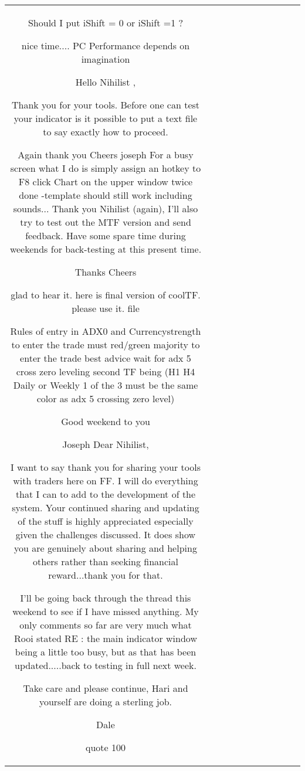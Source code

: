 \begin{table}[h!]
\begin{tabular}{|c|c|c|c|c|c|c|c|c|c|c|}
Should I put iShift = 0 or iShift =1 ?

nice time....
PC
Performance depends on imagination

Hello Nihilist ,

Thank you for your tools. Before one can test your indicator is it possible to put a text file to say exactly how to proceed.

Again thank you Cheers joseph
For a busy screen what I do is simply assign an hotkey to F8 click Chart on the upper window twice done -template should still work including sounds...
Thank you Nihilist (again), I'll also try to test out the MTF version and send feedback. Have some spare time during weekends for back-testing at this present time.

Thanks
Cheers

glad to hear it. here is final version of coolTF. please use it. {file}

Rules of entry in ADX0 and Currencystrength to enter the trade must red/green majority to enter the trade best advice wait
for adx 5 cross zero leveling second TF being (H1 H4 Daily or Weekly 1 of the 3 must be the same color as adx 5 crossing zero level)

Good weekend to you

Joseph
Dear Nihilist,

I want to say thank you for sharing your tools with traders here on FF. I will do everything that I can to add to the development of the system.
Your continued sharing and updating of the stuff is highly appreciated especially given the challenges discussed. It does show you are genuinely about sharing and helping others rather than seeking financial reward...thank you for that.


I'll be going back through the thread this weekend to see if I have missed anything. My only comments so far are very much what Rooi stated RE : the main indicator window being a little too busy, but as that has been updated.....back to testing in full next week.

Take care and please continue, Hari and yourself are doing a sterling job.

Dale

{quote} 100%


\end{tabular}
\end{table}
